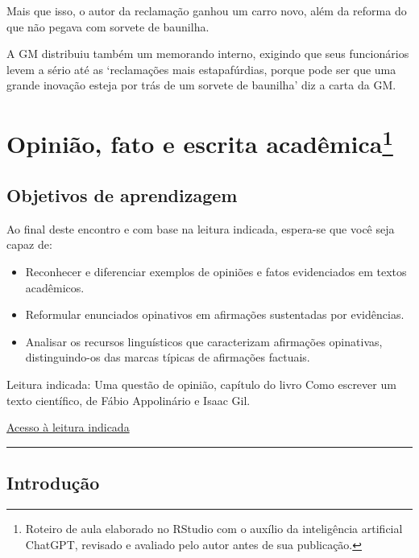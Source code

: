 \documentclass[
]{book}
\begin{document}
Mais que isso, o autor da reclamação ganhou um carro novo, além da reforma do que não pegava com sorvete de baunilha.

A GM distribuiu também um memorando interno, exigindo que seus funcionários levem a sério até as `reclamações mais estapafúrdias, porque pode ser que uma grande inovação esteja por trás de um sorvete de baunilha' diz a carta da GM.

\chapter[Opinião, fato e escrita acadêmica]{\texorpdfstring{Opinião, fato e escrita acadêmica\footnote{Roteiro de aula elaborado no RStudio com o auxílio da inteligência artificial ChatGPT, revisado e avaliado pelo autor antes de sua publicação.}}{Opinião, fato e escrita acadêmica}}\label{opiniuxe3o-fato-e-escrita-acaduxeamica1}

\section{Objetivos de aprendizagem}\label{objetivos-de-aprendizagem-1}

Ao final deste encontro e com base na leitura indicada, espera-se que você seja capaz de:

\begin{itemize}
\item
  Reconhecer e diferenciar exemplos de opiniões e fatos evidenciados em textos acadêmicos.
\item
  Reformular enunciados opinativos em afirmações sustentadas por evidências.
\item
  Analisar os recursos linguísticos que caracterizam afirmações opinativas, distinguindo-os das marcas típicas de afirmações factuais.
\end{itemize}

Leitura indicada:
Uma questão de opinião, capítulo do livro Como escrever um texto científico, de Fábio Appolinário e Isaac Gil.

\href{vbk://9788599519493/page/11}{Acesso à leitura indicada}

\begin{center}\rule{0.5\linewidth}{0.5pt}\end{center}

\section{Introdução}\label{introduuxe7uxe3o}
\end{document}

